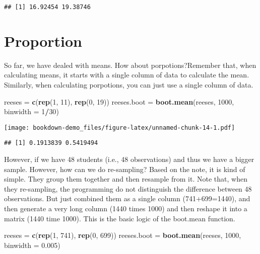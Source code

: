 \documentclass[]{book}
\newenvironment{Shaded}{\begin{snugshade}}{\end{snugshade}}
\newcommand{\DataTypeTok}[1]{\textcolor[rgb]{0.13,0.29,0.53}{#1}}
\newcommand{\DecValTok}[1]{\textcolor[rgb]{0.00,0.00,0.81}{#1}}
\newcommand{\FloatTok}[1]{\textcolor[rgb]{0.00,0.00,0.81}{#1}}
\newcommand{\KeywordTok}[1]{\textcolor[rgb]{0.13,0.29,0.53}{\textbf{#1}}}
\newcommand{\NormalTok}[1]{#1}
\newcommand{\OperatorTok}[1]{\textcolor[rgb]{0.81,0.36,0.00}{\textbf{#1}}}
\newcommand{\StringTok}[1]{\textcolor[rgb]{0.31,0.60,0.02}{#1}}
\begin{document}
\begin{verbatim}
## [1] 16.92454 19.38746
\end{verbatim}

\hypertarget{proportion}{%
\section{Proportion}\label{proportion}}

So far, we have dealed with means. How about porpotions?Remember that, when calculating means, it starts with a single column of data to calculate the mean. Similarly, when calculating porpotions, you can just use a single column of data.

\begin{Shaded}
\begin{Highlighting}[]
\NormalTok{reeses =}\StringTok{ }\KeywordTok{c}\NormalTok{(}\KeywordTok{rep}\NormalTok{(}\DecValTok{1}\NormalTok{, }\DecValTok{11}\NormalTok{), }\KeywordTok{rep}\NormalTok{(}\DecValTok{0}\NormalTok{, }\DecValTok{19}\NormalTok{))}
\NormalTok{reeses.boot =}\StringTok{ }\KeywordTok{boot.mean}\NormalTok{(reeses, }\DecValTok{1000}\NormalTok{, }\DataTypeTok{binwidth =} \DecValTok{1}\OperatorTok{/}\DecValTok{30}\NormalTok{)}
\end{Highlighting}
\end{Shaded}

\texttt{[image: bookdown-demo\_files/figure-latex/unnamed-chunk-14-1.pdf]}

\begin{verbatim}
## [1] 0.1913839 0.5419494
\end{verbatim}

However, if we have 48 students (i.e., 48 observations) and thus we have a bigger sample. However, how can we do re-sampling? Based on the note, it is kind of simple. They group them together and then resample from it. Note that, when they re-sampling, the programming do not distinguish the difference between 48 observations. But just combined them as a single column (741+699=1440), and then generate a very long column (1440 times 1000) and then reshape it into a matrix (1440 time 1000). This is the basic logic of the boot.mean function.

\begin{Shaded}
\begin{Highlighting}[]
\NormalTok{reeses =}\StringTok{ }\KeywordTok{c}\NormalTok{(}\KeywordTok{rep}\NormalTok{(}\DecValTok{1}\NormalTok{, }\DecValTok{741}\NormalTok{), }\KeywordTok{rep}\NormalTok{(}\DecValTok{0}\NormalTok{, }\DecValTok{699}\NormalTok{))}
\NormalTok{reeses.boot =}\StringTok{ }\KeywordTok{boot.mean}\NormalTok{(reeses, }\DecValTok{1000}\NormalTok{, }\DataTypeTok{binwidth =} \FloatTok{0.005}\NormalTok{)}
\end{Highlighting}
\end{Shaded}
\end{document}
